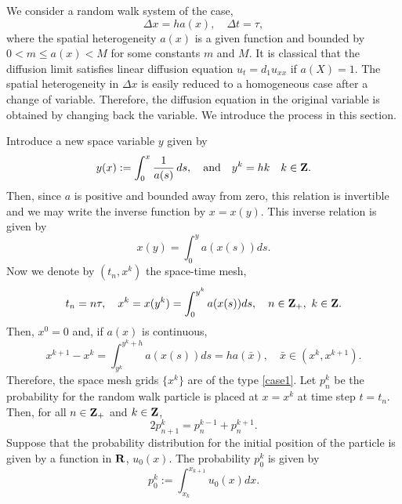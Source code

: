 \documentclass[11pt]{amsart}
\def\R{{\bf R}}
\def\R{{\bf R}}
\def\Z{{\bf Z}}
\begin{document}
We consider a random walk system of the case,
\begin{equation}\label{case1}
\Delta x=ha(x),\quad \Delta t=\tau,
\end{equation}
where the spatial heterogeneity $a(x)$ is a given function and bounded by
$0<m\le a(x)<M$ for some constants $m$ and $M$. It is classical that the diffusion limit satisfies linear diffusion equation $u_t=d_1u_{xx}$ if $a(X)=1$. The spatial heterogeneity in $\Delta x$ is easily reduced to a homogeneous case after a change of variable. Therefore, the diffusion equation in the original variable is obtained by changing back the variable. We introduce the process in this section.

Introduce a new space variable $y$ given by
\begin{equation}\label{y}
y(x):=\int_0^x \frac{1}{a(s)}\,ds,\quad\text{and}\quad y^k=hk\quad k\in\Z.
\end{equation}
Then, since $a$ is positive and bounded away from zero, this relation is invertible and we may write the inverse function by $x=x(y)$. This inverse relation is given by
$$
x(y)=\int_0^y a(x(s))ds.
$$
Now we denote by $(t_n,x^k)$ the space-time mesh,
\begin{equation}\label{x^k}
t_n=n\tau,\quad x^k=x(y^k)=\int_0^{y^k}a(x(s))ds,\quad n\in\Z_+,\ k\in\Z.
\end{equation}
Then, $x^0=0$ and, if $a(x)$ is continuous,
$$
x^{k+1}-x^{k}=\int_{y^k}^{y^k+h}a(x(s))ds=ha(\bar x), \quad\bar x\in(x^{k},x^{k+1}).
$$
Therefore, the space mesh grids $\{x^k\}$ are of the type \eqref{case1}. Let $p_n^k$ be the probability for the random walk particle is placed at $x=x^k$ at time step $t=t_n$. Then, for all $n\in\Z_+$ and $k\in\Z$,
\begin{equation}\label{pnk}
2p_{n+1}^k = p_{n}^{k-1} + p_{n}^{k+1}.
\end{equation}
Suppose that the probability distribution for the initial position of the particle is given by a function in $\R$, $u_0(x)$. The probability $p^k_0$ is given by
\begin{equation}\label{p0k}
p_0^k:=\int_{x_{k}}^{x_{k+1}}u_0(x)dx.
\end{equation}
\end{document}
